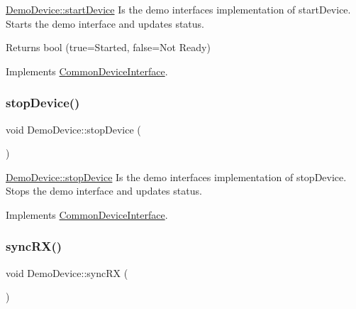 \hyperlink{class_demo_device_af350ecf6ff289983cff9053197f1b1f2}{Demo\+Device\+::start\+Device} Is the demo interface\textquotesingle{}s implementation of start\+Device. Starts the demo interface and updates status. 

\begin{DoxyReturn}{Returns}
bool (true=Started, false=Not Ready) 
\end{DoxyReturn}


Implements \hyperlink{class_common_device_interface_aa25434f588f2b8e4daa77f57f595d161}{Common\+Device\+Interface}.

\hypertarget{class_demo_device_ab95434f7121f00789108f29a8457ec98}{}\label{class_demo_device_ab95434f7121f00789108f29a8457ec98} 
\subsubsection{\texorpdfstring{stop\+Device()}{stopDevice()}}
{\footnotesize\ttfamily void Demo\+Device\+::stop\+Device (\begin{DoxyParamCaption}{ }\end{DoxyParamCaption})\hspace{0.3cm}{\ttfamily [virtual]}}



\hyperlink{class_demo_device_ab95434f7121f00789108f29a8457ec98}{Demo\+Device\+::stop\+Device} Is the demo interface\textquotesingle{}s implementation of stop\+Device. Stops the demo interface and updates status. 



Implements \hyperlink{class_common_device_interface_a53aaf8eee7297f3ee272cc4f366506bf}{Common\+Device\+Interface}.

\hypertarget{class_demo_device_a85671c408f6f08d82a09344ef5f34966}{}\label{class_demo_device_a85671c408f6f08d82a09344ef5f34966} 
\subsubsection{\texorpdfstring{sync\+R\+X()}{syncRX()}}
{\footnotesize\ttfamily void Demo\+Device\+::sync\+RX (\begin{DoxyParamCaption}{ }\end{DoxyParamCaption})\hspace{0.3cm}{\ttfamily [virtual]}}



